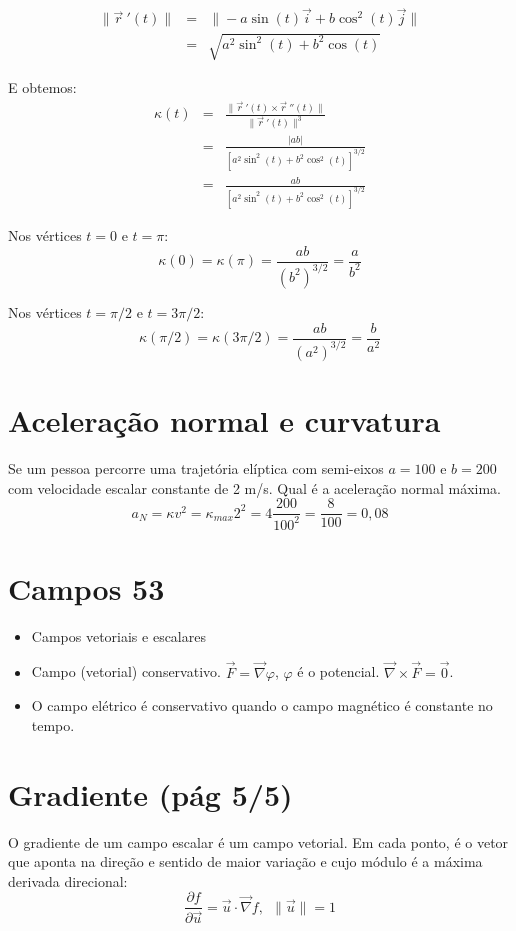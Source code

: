 \documentclass[a4paper,10pt]{article}
\begin{document}
 
 \begin{eqnarray*}
\|\vec{r}\!~'(t)\| &=&\|-a\sin(t)\vec{i}+b\cos^2(t)\vec{j}\|\\
&=& \sqrt{a^2\sin^2(t)+b^2\cos(t)}
 \end{eqnarray*}

E obtemos: 
 \begin{eqnarray*}
  \kappa(t)&=&\frac{\|\vec{r}~\!'(t)\times \vec{r}~\!''(t)\|}{\|\vec{r}~\!'(t)\|^3}\\
  &=&\frac{|ab|}{\left[a^2\sin^2(t)+b^2\cos^2(t)\right]^{3/2}}\\ &=&\frac{ab}{\left[a^2\sin^2(t)+b^2\cos^2(t)\right]^{3/2}}
 \end{eqnarray*}

 Nos vértices $t=0$ e $t=\pi$:
 $$\kappa(0)=\kappa(\pi)=\frac{ab}{(b^2)^{3/2}}=\frac{a}{b^2}$$
 
 
 Nos vértices $t=\pi/2$ e $t=3\pi/2$:
 $$\kappa(\pi/2)=\kappa(3\pi/2)=\frac{ab}{(a^2)^{3/2}}=\frac{b}{a^2}$$
 
 
 \section{Aceleração normal e curvatura}
 Se um pessoa percorre uma trajetória elíptica com semi-eixos $a=100$ e $b=200$ com velocidade escalar constante de 2 m/s. Qual é a aceleração normal máxima.
 $$a_N = \kappa v^2=\kappa_{max} 2^2=4\frac{200}{100^2}=\frac{8}{100}=0,08$$
 
 \section{Campos 53}
 \begin{itemize}
  \item Campos vetoriais e escalares
  \item Campo (vetorial) conservativo. $\vec{F}=\vec{\nabla}\varphi$, $\varphi$ é o potencial. $\vec{\nabla}\times\vec{F}=\vec{0}$.
  \item O campo elétrico é conservativo quando o campo magnético é constante no tempo.
  \end{itemize}

\section{Gradiente (pág 5/5)}
O gradiente de um campo escalar é um campo vetorial. Em cada ponto, é o vetor que aponta na direção e sentido de maior variação e cujo módulo é a máxima derivada direcional:
  $$\frac{\partial f}{\partial \vec{u}}=\vec{u}\cdot\vec{\nabla} f,~~\|\vec{u}\|=1$$ 
\end{document}
